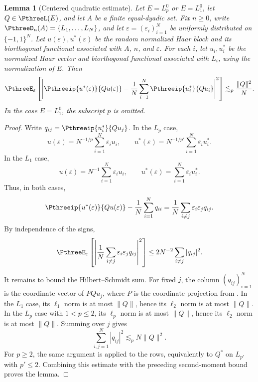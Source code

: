 \documentclass[11pt,reqno]{amsart}
\makeatletter
\theoremstyle{plain}
\newtheorem{lemma}[lemma]{Lemma}
\theoremstyle{definition}
\newcounter{problempaper}
\newenvironment{problempaperbody}{%
  \setcounter{subsection}{0}%
  \setcounter{subsubsection}{0}%
  \setcounter{paragraph}{0}%
  \renewcommand{\thesubsection}{\arabic{subsection}}%
  \renewcommand{\thesubsubsection}{\thesubsection.\arabic{subsubsection}}%
  \renewcommand{\theparagraph}{\thesubsubsection.\arabic{paragraph}}%
  \let\problem@outersection\section
  \let\problem@outersubsection\subsection
  \let\problem@outersubsubsection\subsubsection
  \let\problem@outerparagraph\paragraph
  \let\section\problem@papersection
  \let\subsection\problem@papersubsection
  \let\subsubsection\problem@papersubsubsection
}{%
  \let\section\problem@outersection
  \let\subsection\problem@outersubsection
  \let\subsubsection\problem@outersubsubsection
  \let\paragraph\problem@outerparagraph
}
\newcommand{\problem@target}[2]{%
  \hypertarget{problem-\theproblempaper-#1-#2}{}%
}
\newcommand{\problem@paperheading}[3]{%
  \par\bigskip
  \problem@target{#1}{#2}%
  \noindent{\large\bfseries #2.\quad #3\par}%
  \nobreak\smallskip
}
\newcommand{\problem@papersubheading}[3]{%
  \par\medskip
  \problem@target{#1}{#2}%
  \noindent{\normalsize\bfseries #2.\quad #3\par}%
  \nobreak\smallskip
}
\newcommand{\problem@papersubsubheading}[3]{%
  \par\smallskip
  \problem@target{#1}{#2}%
  \noindent{\normalsize\itshape #2.\quad #3.\ }%
}
\def\problem@papersection{%
  \@ifstar{\problem@papersectionstar}{\problem@papersectionnostar}%
}
\def\problem@papersectionstar#1{%
  \par\bigskip\noindent{\large\bfseries #1\par}\nobreak\smallskip
}
\def\problem@papersectionnostar#1{%
  \refstepcounter{subsection}%
  \setcounter{subsubsection}{0}%
  \setcounter{paragraph}{0}%
  \problem@paperheading{section}{\thesubsection}{#1}%
  \problem@writecontentsline{section}{\thesubsection}{#1}%
}
\def\problem@papersubsection{%
  \@ifstar{\problem@papersubsectionstar}{\problem@papersubsectionnostar}%
}
\def\problem@papersubsectionstar#1{%
  \par\medskip\noindent{\normalsize\bfseries #1\par}\nobreak\smallskip
}
\def\problem@papersubsectionnostar#1{%
  \refstepcounter{subsubsection}%
  \setcounter{paragraph}{0}%
  \problem@papersubheading{subsection}{\thesubsubsection}{#1}%
  \problem@writecontentsline{subsection}{\thesubsubsection}{#1}%
}
\def\problem@papersubsubsection{%
  \@ifstar{\problem@papersubsubsectionstar}{\problem@papersubsubsectionnostar}%
}
\def\problem@papersubsubsectionstar#1{%
  \par\smallskip\noindent{\normalsize\itshape #1.\ }%
}
\def\problem@papersubsubsectionnostar#1{%
  \refstepcounter{paragraph}%
  \problem@papersubsubheading{subsubsection}{\theparagraph}{#1}%
  \problem@writecontentsline{subsubsection}{\theparagraph}{#1}%
}
\newcommand{\problem@writecontentsline}[3]{%
  \begingroup
  \protected@write\@auxout{}{%
    \string\problemcontentsentry{\theproblempaper}{#1}{#2}{#3}{\thepage}%
  }%
  \endgroup
}
\newcommand{\problemcontentsentry}[5]{%
  \@ifundefined{problemcontents@#1}{%
    \expandafter\gdef\csname problemcontents@#1\endcsname{}%
  }{}%
  \expandafter\g@addto@macro\csname problemcontents@#1\endcsname{%
    \problemcontentsline{#1}{#2}{#3}{#4}{#5}%
  }%
}
\newcommand{\problemcontentslink}[4]{%
  \hyperlink{problem-#1-#2-#3}{#4}%
}
\newcommand{\problemcontentsline}[5]{%
  \ifstrequal{#2}{section}{%
    \par\noindent
    \problemcontentslink{#1}{#2}{#3}{\makebox[2.5em][l]{#3}#4}%
    \nobreak\dotfill
    \problemcontentslink{#1}{#2}{#3}{#5}\par
  }{%
    \ifstrequal{#2}{subsection}{%
      \par\noindent\hspace*{1.5em}%
      \problemcontentslink{#1}{#2}{#3}{\makebox[3.5em][l]{#3}#4}%
      \nobreak\dotfill
      \problemcontentslink{#1}{#2}{#3}{#5}\par
    }{%
      \par\noindent\hspace*{3em}%
      \problemcontentslink{#1}{#2}{#3}{\makebox[4.5em][l]{#3}#4}%
      \nobreak\dotfill
      \problemcontentslink{#1}{#2}{#3}{#5}\par
    }%
  }%
}
\makeatother
\begin{document}
\begin{problempaperbody}
\begin{lemma}[Centered quadratic estimate]
\label{p3:lem:centered}
Let $E=L_p^0$ or $E=L_1^0$, let $Q\in\PthreeL(E)$, and let $A$ be a finite equal-dyadic set. Fix $n\geq0$, write $\PthreeD_n(A)=\{L_1,\ldots,L_N\}$, and let $\varepsilon=(\varepsilon_i)_{i=1}^N$ be uniformly distributed on $\{-1,1\}^N$. Let $u(\varepsilon),u^*(\varepsilon)$ be the random normalized Haar block and its biorthogonal functional associated with $A$, $n$, and $\varepsilon$. For each $i$, let $u_i,u_i^*$ be the normalized Haar vector and biorthogonal functional associated with $L_i$, using the normalization of $E$. Then
\begin{equation*}
        \PthreeE_\varepsilon\left[\left|\Pthreeip{u^*(\varepsilon)}{Qu(\varepsilon)}-\frac1N\sum_{i=1}^N\Pthreeip{u_i^*}{Qu_i}\right|^2\right]\lesssim_p \frac{\|Q\|^2}{N}.
\end{equation*}
In the case $E=L_1^0$, the subscript $p$ is omitted.
\end{lemma}

\begin{proof}
Write $q_{ij}=\Pthreeip{u_i^*}{Qu_j}$. In the $L_p$ case,
\begin{equation*}
        u(\varepsilon)=N^{-1/p}\sum_{i=1}^N\varepsilon_iu_i,\qquad u^*(\varepsilon)=N^{-1/p'}\sum_{i=1}^N\varepsilon_iu_i^*.
\end{equation*}
In the $L_1$ case,
\begin{equation*}
        u(\varepsilon)=N^{-1}\sum_{i=1}^N\varepsilon_iu_i,\qquad u^*(\varepsilon)=\sum_{i=1}^N\varepsilon_iu_i^*.
\end{equation*}
Thus, in both cases,
\begin{equation*}
        \Pthreeip{u^*(\varepsilon)}{Qu(\varepsilon)}-\frac1N\sum_{i=1}^Nq_{ii}=\frac1N\sum_{i\ne j}\varepsilon_i\varepsilon_jq_{ij}.
\end{equation*}
By independence of the signs,
\begin{equation*}
        \PthreeE_\varepsilon\left[\left|\frac1N\sum_{i\ne j}\varepsilon_i\varepsilon_jq_{ij}\right|^2\right]\leq 2N^{-2}\sum_{i\ne j}|q_{ij}|^2.
\end{equation*}
It remains to bound the Hilbert--Schmidt sum. For fixed $j$, the column $(q_{ij})_{i=1}^N$ is the coordinate vector of $PQu_j$, where $P$ is the coordinate projection from . In the $L_1$ case, its $\ell_1$ norm is at most $\|Q\|$, hence its $\ell_2$ norm is at most $\|Q\|$. In the $L_p$ case with $1<p\leq2$, its $\ell_p$ norm is at most $\|Q\|$, hence its $\ell_2$ norm is at most $\|Q\|$. Summing over $j$ gives
\begin{equation*}
        \sum_{i,j=1}^N|q_{ij}|^2\lesssim_p N\|Q\|^2.
\end{equation*}
For $p\geq2$, the same argument is applied to the rows, equivalently to $Q^*$ on $L_{p'}$ with $p'\leq2$. Combining this estimate with the preceding second-moment bound proves the lemma.
\end{proof}


\end{problempaperbody}
\end{document}
